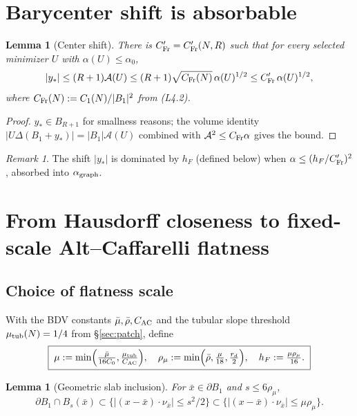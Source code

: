 \documentclass[11pt]{article}
\newtheorem{lemma}[theorem]{Lemma}
\theoremstyle{definition}
\theoremstyle{remark}
\newtheorem{remark}[theorem]{Remark}
\newcommand{\BB}{B_1}
\newcommand{\Aa}{\mathcal{A}}
\begin{document}
\section{Barycenter shift is absorbable}\label{sec:bary}

\begin{lemma}[Center shift]\label{lem:bary}
There is $C_{\rm Fr}'=C_{\rm Fr}'(N,R)$ such that for every selected
minimizer $U$ with $\alpha(U)\le\alpha_0$,
\[
|y_*|\le (R+1)\Aa(U)\le(R+1)\sqrt{C_{\rm Fr}(N)}\,\alpha(U)^{1/2}
\le C_{\rm Fr}'\,\alpha(U)^{1/2},
\]
where $C_{\rm Fr}(N):=C_1(N)/|\BB|^2$ from (L4.2).
\end{lemma}

\begin{proof}
$y_*\in B_{R+1}$ for smallness reasons; the volume identity
$|U\Delta(\BB+y_*)|=|\BB|\Aa(U)$ combined with $\Aa^2\le C_{\rm Fr}\alpha$
gives the bound.
\end{proof}

\begin{remark}
The shift $|y_*|$ is dominated by $h_F$ (defined below) when
$\alpha\le(h_F/C_{\rm Fr}')^2$, absorbed into $\alpha_{\rm graph}$.
\end{remark}

\section{From Hausdorff closeness to fixed-scale Alt--Caffarelli flatness}
\label{sec:flatness}

\subsection{Choice of flatness scale}\label{ssec:scale}

With the BDV constants $\bar\mu,\bar\rho,C_{\rm AC}$ and the tubular slope
threshold $\mu_{\rm tub}(N)=1/4$ from \S\ref{sec:patch}, define
\[
\boxed{\;
\mu:=\min\Bigl(\tfrac{\bar\mu}{16C_0},\tfrac{\mu_{\rm tub}}{C_{\rm AC}}\Bigr),\quad
\rho_\mu:=\min\Bigl(\bar\rho,\tfrac{\mu}{18},\tfrac{r_d}{2}\Bigr),\quad
h_F:=\tfrac{\mu\rho_\mu}{16}.\;}
\]

\begin{lemma}[Geometric slab inclusion]\label{lem:slab}
For $\bar x\in\partial\BB$ and $s\le 6\rho_\mu$,
\[
\partial\BB\cap B_s(\bar x)
\subset\bigl\{|(x-\bar x)\cdot\nu_{\bar x}|\le s^2/2\bigr\}
\subset\bigl\{|(x-\bar x)\cdot\nu_{\bar x}|\le\mu\rho_\mu\bigr\}.
\]
\end{lemma}
\end{document}
